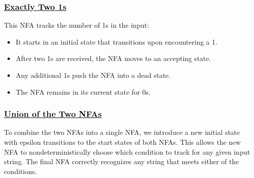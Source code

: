 \documentclass[12pt]{article}
\begin{document}
	\subsubsection*{\underline{Exactly Two 1s}}
	This NFA tracks the number of 1s in the input:
	\begin{itemize}
		\item It starts in an initial state that transitions upon encountering a 1.
		\item After two 1s are received, the NFA moves to an accepting state.
		\item Any additional 1s push the NFA into a dead state.
		\item The NFA remains in its current state for 0s.
	\end{itemize}
	
	\subsubsection*{\underline{Union of the Two NFAs}}
	To combine the two NFAs into a single NFA, we introduce a new initial state with epsilon transitions to the start states of both NFAs. This allows the new NFA to nondeterministically choose which condition to track for any given input string. The final NFA correctly recognizes any string that meets either of the conditions.
	
\end{document}
